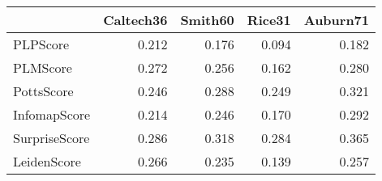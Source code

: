 \begin{tabular}{lrrrr}
\toprule
{} & Caltech36 & Smith60 & Rice31 & Auburn71 \\
\midrule
PLPScore      &     0.212 &   0.176 &  0.094 &    0.182 \\
PLMScore      &     0.272 &   0.256 &  0.162 &    0.280 \\
PottsScore    &     0.246 &   0.288 &  0.249 &    0.321 \\
InfomapScore  &     0.214 &   0.246 &  0.170 &    0.292 \\
SurpriseScore &     0.286 &   0.318 &  0.284 &    0.365 \\
LeidenScore   &     0.266 &   0.235 &  0.139 &    0.257 \\
\bottomrule
\end{tabular}
